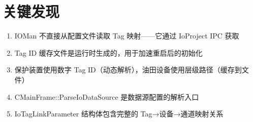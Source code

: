 \documentclass[12pt,a4paper]{ctexart}
\begin{document}
\section{关键发现}

\begin{enumerate}[leftmargin=*]
  \item IOMan 不直接从配置文件读取 Tag 映射——它通过 IoProject IPC 获取
  \item Tag ID 缓存文件是运行时生成的，用于加速重启后的初始化
  \item 保护装置使用数字 Tag ID（动态解析），油田设备使用层级路径（缓存到文件）
  \item CMainFrame::ParseIoDataSource 是数据源配置的解析入口
  \item IoTagLinkParameter 结构体包含完整的 Tag→设备→通道映射关系
\end{enumerate}
\end{document}
